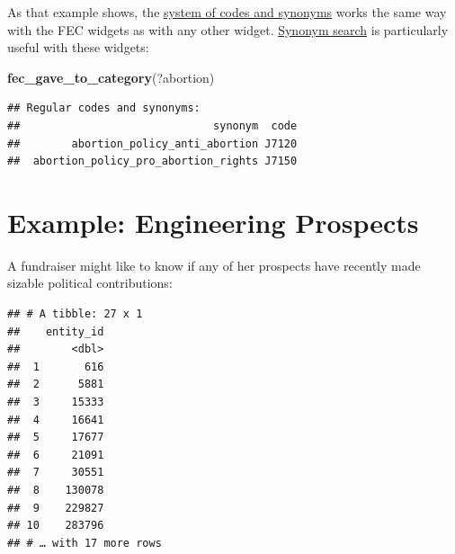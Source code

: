 \documentclass[]{book}
\newenvironment{Shaded}{\begin{snugshade}}{\end{snugshade}}
\newcommand{\CommentTok}[1]{\textcolor[rgb]{0.56,0.35,0.01}{\textit{#1}}}
\newcommand{\DataTypeTok}[1]{\textcolor[rgb]{0.13,0.29,0.53}{#1}}
\newcommand{\DecValTok}[1]{\textcolor[rgb]{0.00,0.00,0.81}{#1}}
\newcommand{\KeywordTok}[1]{\textcolor[rgb]{0.13,0.29,0.53}{\textbf{#1}}}
\newcommand{\NormalTok}[1]{#1}
\newcommand{\OperatorTok}[1]{\textcolor[rgb]{0.81,0.36,0.00}{\textbf{#1}}}
\newcommand{\StringTok}[1]{\textcolor[rgb]{0.31,0.60,0.02}{#1}}
\begin{document}
As that example shows, the \protect\hyperlink{working-with-codes-synonyms}{system of codes and synonyms} works the same way with the FEC widgets as with any other widget. \protect\hyperlink{synonym-search}{Synonym search} is particularly useful with these widgets:

\begin{Shaded}
\begin{Highlighting}[]
\KeywordTok{fec_gave_to_category}\NormalTok{(?abortion)}
\end{Highlighting}
\end{Shaded}

\begin{verbatim}
## Regular codes and synonyms:
##                              synonym  code
##        abortion_policy_anti_abortion J7120
##  abortion_policy_pro_abortion_rights J7150
\end{verbatim}

\hypertarget{example-engineering-prospects}{%
\section{Example: Engineering Prospects}\label{example-engineering-prospects}}

A fundraiser might like to know if any of her prospects have recently made sizable political contributions:

\begin{Shaded}
\end{Shaded}

\begin{verbatim}
## # A tibble: 27 x 1
##    entity_id
##        <dbl>
##  1       616
##  2      5881
##  3     15333
##  4     16641
##  5     17677
##  6     21091
##  7     30551
##  8    130078
##  9    229827
## 10    283796
## # … with 17 more rows
\end{verbatim}
\end{document}
